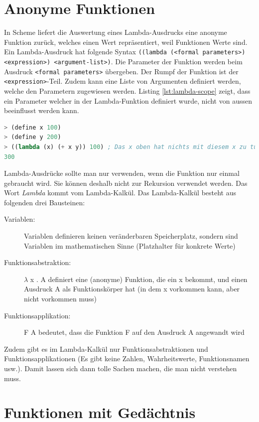 \section{Anonyme Funktionen}

In Scheme liefert die Auswertung eines Lambda-Ausdrucks eine anonyme Funktion zurück, welches einen Wert repräsentiert, weil Funktionen Werte sind. Ein Lambda-Ausdruck hat folgende Syntax \verb|((lambda (<formal parameters>) <expression>) <argument-list>)|. Die Parameter der Funktion werden beim Ausdruck \verb|<formal parameters>| übergeben. Der Rumpf der Funktion ist der \verb|<expression>|-Teil. Zudem kann eine Liste von Argumenten definiert werden, welche den Parametern zugewiesen werden. Listing \ref{lst:lambda-scope} zeigt, dass ein Parameter welcher in der Lambda-Funktion definiert wurde, nicht von aussen beeinflusst werden kann.

\begin{lstlisting}[language=Lisp, caption=Scope eines Lambda-Ausdrucks, label=lst:lambda-scope]
> (define x 100)
> (define y 200)
> ((lambda (x) (+ x y)) 100) ; Das x oben hat nichts mit diesem x zu tun
300
\end{lstlisting}

Lambda-Ausdrücke sollte man nur verwenden, wenn die Funktion nur einmal gebraucht wird. Sie können deshalb nicht zur Rekursion verwendet werden. Das Wort \textit{Lambda} kommt vom Lambda-Kalkül. Das Lambda-Kalkül besteht aus folgenden drei Bausteinen:
\begin{description}
	\item[Variablen:] Variablen definieren keinen veränderbaren Speicherplatz, sondern sind Variablen im mathematischen Sinne (Platzhalter für konkrete Werte)
	\item[Funktionsabstraktion:]  $\lambda$ x . A definiert eine (anonyme) Funktion, die ein x bekommt, und einen Ausdruck A als Funktionskörper hat (in dem x vorkommen kann, aber nicht vorkommen muss)
	\item[Funktionsapplikation:] F A bedeutet, dass die Funktion F auf den Ausdruck A angewandt wird
\end{description}
Zudem gibt es im Lambda-Kalkül nur Funktionsabstraktionen und Funktionsapplikationen (Es gibt keine Zahlen, Wahrheitswerte, Funktionsnamen usw.). Damit lassen sich dann tolle Sachen machen, die man nicht verstehen muss.

\section{Funktionen mit Gedächtnis}

